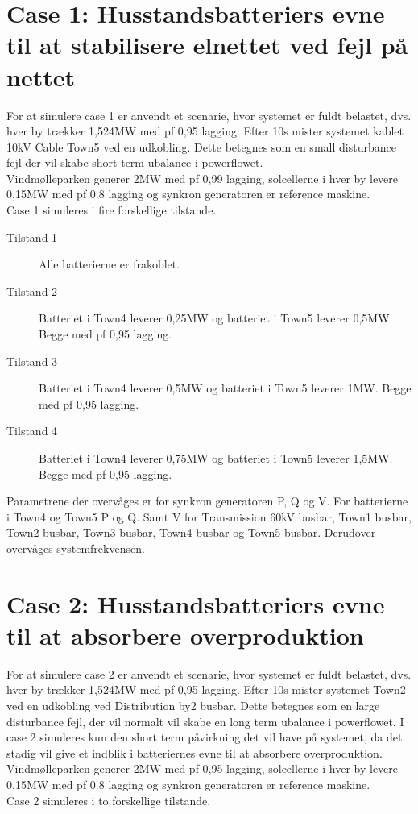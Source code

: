 
\label{Simulering}

\section{Case 1: Husstandsbatteriers evne til at stabilisere elnettet ved fejl på nettet}
For at simulere case 1 er anvendt et scenarie, hvor systemet er fuldt belastet, dvs. hver by trækker 1,524MW med pf 0,95 lagging. Efter 10s mister systemet kablet 10kV Cable Town5 ved en udkobling. Dette betegnes som en small disturbance fejl der vil skabe short term ubalance i powerflowet.\\
Vindmølleparken generer 2MW med pf 0,99 lagging, solcellerne i hver by levere 0,15MW med pf 0.8 lagging og synkron generatoren er reference maskine.\\
Case 1 simuleres i fire forskellige tilstande.

\begin{description}
	\item[Tilstand 1] Alle batterierne er frakoblet.
	\item[Tilstand 2] Batteriet i Town4 leverer 0,25MW og batteriet i Town5 leverer 0,5MW. Begge med pf 0,95 lagging.
	\item[Tilstand 3] Batteriet i Town4 leverer 0,5MW og batteriet i Town5 leverer 1MW. Begge med pf 0,95 lagging.
	\item[Tilstand 4] Batteriet i Town4 leverer 0,75MW og batteriet i Town5 leverer 1,5MW. Begge med pf 0,95 lagging.
\end{description}

Parametrene der overvåges er for synkron generatoren P, Q og V.
For batterierne i Town4 og Town5 P og Q. Samt V for Transmission 60kV busbar, Town1 busbar, Town2 busbar, Town3 busbar, Town4 busbar og Town5 busbar.
Derudover overvåges systemfrekvensen.

\section{Case 2: Husstandsbatteriers evne til at absorbere overproduktion}
For at simulere case 2 er anvendt et scenarie, hvor systemet er fuldt belastet, dvs. hver by trækker 1,524MW med pf 0,95 lagging. Efter 10s mister systemet Town2 ved en udkobling ved Distribution by2 busbar. Dette betegnes som en large disturbance fejl, der vil normalt vil skabe en long term ubalance i powerflowet. I case 2 simuleres kun den short term påvirkning det vil have på systemet, da det stadig vil give et indblik i batteriernes evne til at absorbere overproduktion.\\
Vindmølleparken generer 2MW med pf 0,95 lagging, solcellerne i hver by levere 0,15MW med pf 0.8 lagging og synkron generatoren er reference maskine.\\
Case 2 simuleres i to forskellige tilstande.

